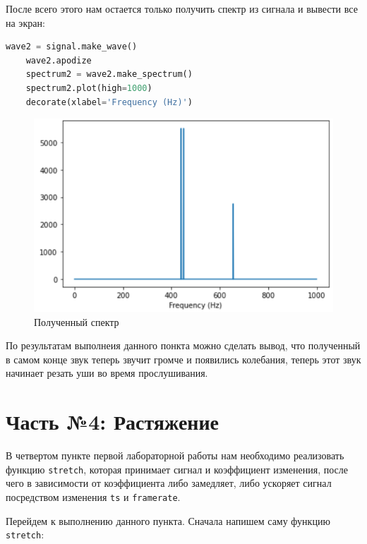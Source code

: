 \documentclass[a4paper]{article}
\begin{document}
            После всего этого нам остается только получить спектр из сигнала и вывести все на экран:
            
\begin{lstlisting}[language=Python, caption= Получение спектра и вывод на экран]
    wave2 = signal.make_wave()
    wave2.apodize
    spectrum2 = wave2.make_spectrum()
    spectrum2.plot(high=1000)
    decorate(xlabel='Frequency (Hz)')
\end{lstlisting}
            
            \begin{figure}[H]
                \centering
                \includegraphics[width=\textwidth]{spectr_sum_add_result.png}
                \caption{Полученный спектр}
                \label{fig:spectr_sum_add_result}
            \end{figure}
            
            По результатам выполнеия данного понкта можно сделать вывод, что полученный в самом конце звук теперь звучит громче и появились колебания, теперь этот звук начинает резать уши во время прослушивания.
            
    \newpage
        \section{Часть №4: Растяжение}
            В четвертом пункте первой лабораторной работы нам необходимо реализовать функцию \texttt{stretch}, которая принимает сигнал и коэффициент изменения, после чего в зависимости от коэффициента либо замедляет, либо ускоряет сигнал посредством изменения \texttt{ts} и \texttt{framerate}.
            
            Перейдем к выполнению данного пункта. Сначала напишем саму функцию \texttt{stretch}:
            
\end{document}
